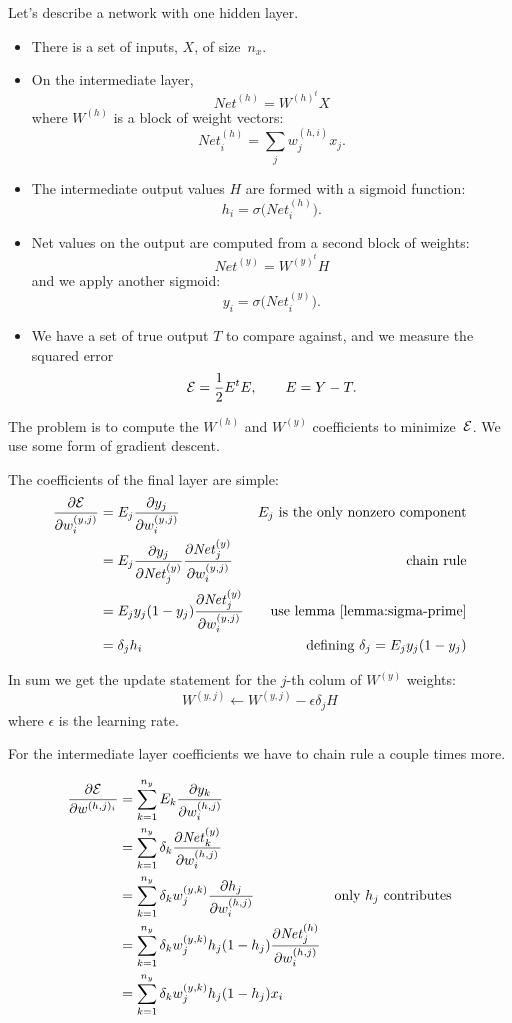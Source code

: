 Let's describe a network with one hidden layer.
\def\net{\mathord{\mathit{Net}}}
\def\eE{{\cal E}}
\begin{itemize}
\item There is a set of inputs, $X$, of size~$n_x$.
\item On the intermediate layer,
  \[ \net^{(h)}= W^{ {(h)}^t }X \]
  where $W^{(h)}$ is a block of weight vectors:
  \[ \net^{(h)}_i = \sum_j w^{(h,i)}_jx_j. \]
\item The intermediate output values $H$ are formed with a sigmoid
  function:
  \[ h_i=\sigma\bigl(\net^{(h)}_i\bigr). \]
\item Net values on the output are computed from a second block of
  weights:
  \[ \net^{(y)}=W^{ {(y)}^t }H \]
  and we apply another sigmoid:
  \[ y_i=\sigma\bigl(\net^{(y)}_i\bigr). \]
\item We have a set of true output $T$ to compare against, and we
  measure the squared error
  \[ \eE=\frac12 E^tE,\qquad E=Y-T. \]
\end{itemize}

The problem is to compute the $W^{(h)}$ and $W^{(y)}$ coefficients to
minimize~$\eE$. We use some form of gradient descent.

The coefficients of the final layer are simple:
\begin{align}
  \frac{\partial\eE}{\partial w^{(y,j)}_i}
  &=E_j\frac{\partial y_j}{\partial w^{(y,j)}_i}
  &\hbox{$E_j$ is the only nonzero component}\\
  &=E_j \frac{\partial y_j}{\partial \net^{(y)}_j}
  \frac{\partial \net^{(y)}_j}{\partial w^{(y,j)}_i}
  &\hbox{chain rule}\\
  &=E_j y_j(1-y_j)
  \frac{\partial \net^{(y)}_j}{\partial w^{(y,j)}_i}
  &\hbox{use lemma~\ref{lemma:sigma-prime}}\\
  &=\delta_j h_i
  &\hbox{defining $\delta_j=E_jy_j(1-y_j)$}\\
\end{align}

In sum we get the update statement for the $j$-th colum of $W^{(y)}$
weights:
\[ W^{(y,j)} \leftarrow W^{(y,j)} - \epsilon \delta_j H \]
where $\epsilon$ is the learning rate.

For the intermediate layer coefficients we have to chain rule a couple
times more.

\begin{align}
  \frac{\partial\eE}{\partial w^{(h,j)_i}}
  &=\sum_{k=1}^{n_y} E_k\frac{\partial y_k}{\partial w^{(h,j)}_i}\\
  &=\sum_{k=1}^{n_y} \delta_k\frac{\partial \net^{(y)}_k}{\partial w^{(h,j)}_i}\\
  &=\sum_{k=1}^{n_y} \delta_k w^{(y,k)}_j
  \frac{\partial h_j}{\partial w^{(h,j)}_i}
  &\hbox{only $h_j$ contributes}\\
  &=\sum_{k=1}^{n_y} \delta_k w^{(y,k)}_j h_j(1-h_j)
  \frac{\partial \net^{(h)}_j}{\partial w^{(h,j)}_i}\\
  &=\sum_{k=1}^{n_y} \delta_k w^{(y,k)}_j h_j(1-h_j) x_i\\
\end{align}

